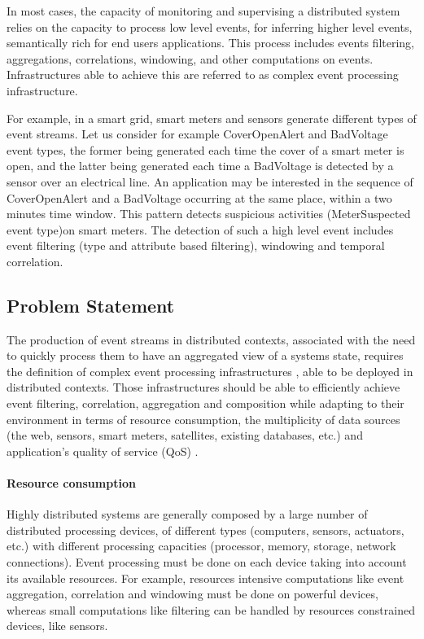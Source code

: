 \documentclass[a4paper,twoside]{article}
\begin{document}
In most cases, the capacity of monitoring and supervising a distributed system relies on the capacity to process low level events, for inferring higher level events, semantically rich for end users applications. This process includes events filtering, aggregations, correlations, windowing, and other computations on events. Infrastructures able to achieve this are referred to as complex event processing infrastructure. 

For example, in a smart grid, smart meters and sensors generate different types of event streams. Let us consider for example CoverOpenAlert and BadVoltage event types, the former being generated each time the cover of a smart meter is open, and the latter being generated each time a BadVoltage is detected by a sensor over an electrical line. An application may be interested in the sequence of CoverOpenAlert and a BadVoltage occurring at the same place, within a two minutes time window. This pattern detects suspicious activities (MeterSuspected event type)on smart meters.  The detection of such a high level event includes event filtering (type and attribute based filtering), windowing and temporal correlation.
\subsection{Problem Statement}
The production of event streams in distributed contexts, associated with the need to quickly process them to have an aggregated view of a systems state, requires the definition of complex event processing infrastructures \cite{Esper,Streambase,Cugola2009,Gyllstrom2006,Oracle}, able to be deployed in distributed contexts. Those infrastructures should be able to efficiently achieve event filtering, correlation, aggregation and composition while adapting to their environment in terms of resource consumption, the multiplicity of data sources (the web, sensors, smart meters, satellites, existing databases, etc.) and application’s quality of service (QoS) \cite{Appel2010}.
\paragraph{Resource consumption}
Highly distributed systems are generally composed by a large number of distributed processing devices, of different types (computers, sensors, actuators, etc.) with different processing capacities (processor, memory, storage, network connections). Event processing must be done on each device taking into account its available resources. For example, resources intensive computations like event aggregation, correlation and windowing must be done on powerful devices, whereas small computations like filtering can be handled by resources constrained devices, like sensors.
\end{document}

